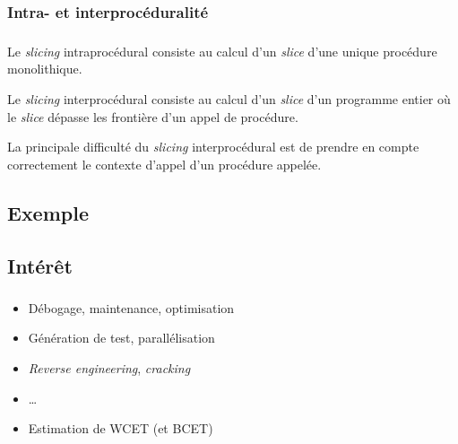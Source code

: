 \documentclass{beamer}
\begin{document}
      \subsubsection*{Intra- et interprocéduralité}
      \begin{frame}
        \frametitle{\subsecname}
        \framesubtitle{\subsubsecname}

        Le \emph{slicing} intraprocédural consiste au calcul d'un \emph{slice}
        d'une unique procédure monolithique.
        \vspace{1em}\pause
        
        Le \emph{slicing} interprocédural consiste au calcul d'un \emph{slice}
        d'un programme entier où le \emph{slice} dépasse les frontière d'un
        appel de procédure.
        \vspace{1em}\pause

        La principale difficulté du \emph{slicing}
        interprocédural est de prendre en compte correctement le contexte d'appel
        d'un procédure appelée.
      \end{frame}
      
  \subsection{Exemple} %
    
      
    \subsection{Intérêt} %
      \begin{frame}
        \frametitle{\subsecname}

        \begin{itemize}
          \item Débogage, maintenance, optimisation
          \item Génération de test, parallélisation
          \item \emph{Reverse engineering}, \emph{cracking}
          \item \dots
            \vspace{1em}\pause
          \item Estimation de WCET (et BCET)
        \end{itemize}
      \end{frame}
\end{document}
